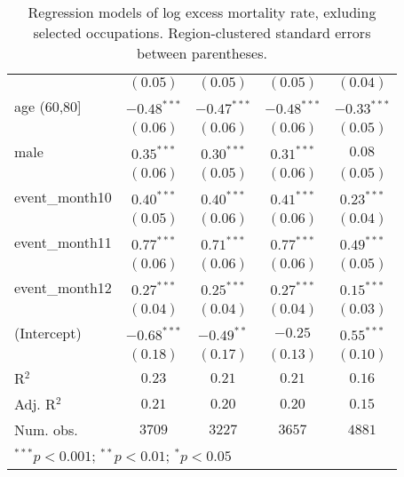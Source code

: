 \begin{table}
\begin{center}
\begin{tabular}{l c c c c}
               & $(0.05)$      & $(0.05)$      & $(0.05)$      & $(0.04)$      \\
age (60,80]    & $-0.48^{***}$ & $-0.47^{***}$ & $-0.48^{***}$ & $-0.33^{***}$ \\
               & $(0.06)$      & $(0.06)$      & $(0.06)$      & $(0.05)$      \\
male           & $0.35^{***}$  & $0.30^{***}$  & $0.31^{***}$  & $0.08$        \\
               & $(0.06)$      & $(0.05)$      & $(0.06)$      & $(0.05)$      \\
event\_month10 & $0.40^{***}$  & $0.40^{***}$  & $0.41^{***}$  & $0.23^{***}$  \\
               & $(0.05)$      & $(0.06)$      & $(0.06)$      & $(0.04)$      \\
event\_month11 & $0.77^{***}$  & $0.71^{***}$  & $0.77^{***}$  & $0.49^{***}$  \\
               & $(0.06)$      & $(0.06)$      & $(0.06)$      & $(0.05)$      \\
event\_month12 & $0.27^{***}$  & $0.25^{***}$  & $0.27^{***}$  & $0.15^{***}$  \\
               & $(0.04)$      & $(0.04)$      & $(0.04)$      & $(0.03)$      \\
(Intercept)    & $-0.68^{***}$ & $-0.49^{**}$  & $-0.25$       & $0.55^{***}$  \\
               & $(0.18)$      & $(0.17)$      & $(0.13)$      & $(0.10)$      \\
\hline
R$^2$          & $0.23$        & $0.21$        & $0.21$        & $0.16$        \\
Adj. R$^2$     & $0.21$        & $0.20$        & $0.20$        & $0.15$        \\
Num. obs.      & $3709$        & $3227$        & $3657$        & $4881$        \\
\hline
\multicolumn{5}{l}{\scriptsize{$^{***}p<0.001$; $^{**}p<0.01$; $^{*}p<0.05$}}
\end{tabular}
\caption{Regression models of log excess mortality rate, exluding selected occupations. Region-clustered standard errors between parentheses.}
\label{tab:altoccmodels}
\end{center}
\end{table}
